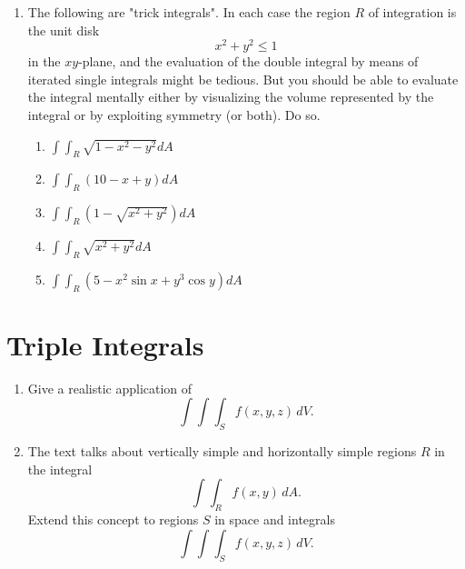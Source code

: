 \begin{enumerate}
\begin{enumerate}
\end{enumerate}  

\item  The following are "trick integrals".  In each case the region $R$ of integration is the unit disk $$ x^2  + y^2  \le 1 $$  in the $xy$-plane, and the evaluation of the double integral by means of iterated single integrals might be tedious.  But you should be able to evaluate the integral mentally either by visualizing the volume represented by the integral or by exploiting symmetry (or both).  Do so.


\begin{enumerate} 

\item  $ \int\!\!\!\int_R {\sqrt {1 - x^2  - y^2 } dA}  $  

\item  $ \int\!\!\!\int_R {\left( {10 - x + y} \right)dA}  $ 
 

\item  $ \int\!\!\!\int_R {\left( {1 - \sqrt {x^2  + y^2 } } \right)dA}  $  

\item  $ \int\!\!\!\int_R {\sqrt {x^2  + y^2 } dA}  $ 
 

\item  $ \int\!\!\!\int_R {\left( {5 - x^2 \sin x + y^3 \cos y} \right)dA}  $   \cite{EP} 
\end{enumerate}  
\end{enumerate}
\section{Triple Integrals}
\begin{enumerate}   

\item  Give a realistic application of $$ \int\!\!\!\int\!\!\!\int_S   {f(x,y,z)\,dV}  .$$  

\item  The text talks about vertically simple and horizontally simple regions $R$ in the integral $$ \int\!\!\!\int_R {f(x,y)\,dA}  .$$  Extend this concept to regions $S$ in space and integrals $$ \int\!\!\!\int\!\!\!\int_S   {f(x,y,z)\,dV}  .$$    

 \end{enumerate}

